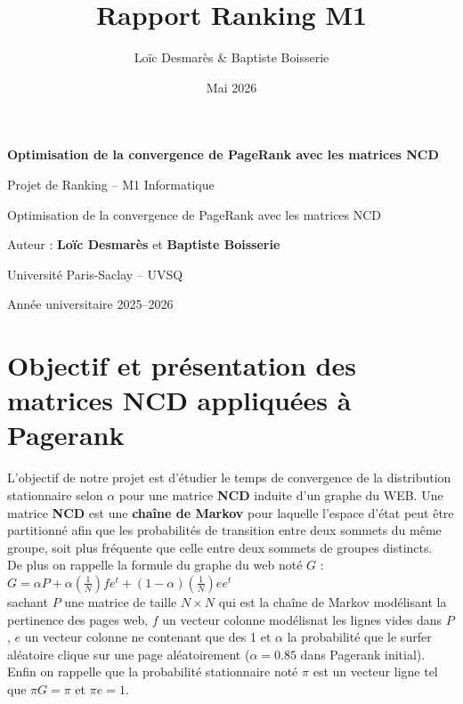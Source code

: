 \documentclass[11pt,oneside,a4paper,french]{article}
\title{Rapport Ranking M1}
\author{Loïc Desmarès & Baptiste Boisserie}
\date{Mai 2026}
\begin{document}
\begin{titlepage}
    \begin{center}

        \vspace*{4cm}
        {\Huge \textbf{Optimisation de la convergence de PageRank avec les matrices NCD} \par}

        \vspace{3cm}
        {\Large Projet de Ranking -- M1 Informatique \par}

        \vspace{0.3cm}
        {\large Optimisation de la convergence de PageRank avec les matrices NCD \par}

        \vspace{8cm}
        {\Large Auteur : \textbf{Loïc Desmarès} et \textbf{Baptiste Boisserie} \par}

        \vspace{1cm}
        {\large Université Paris-Saclay -- UVSQ \par}

        \vspace{0.3cm}
        {\large Année universitaire 2025--2026 \par}
    \end{center}
\end{titlepage}

\newpage
\tableofcontents

\newpage
\section{Objectif et présentation des matrices NCD appliquées à Pagerank}

L'objectif de notre projet est d'étudier le temps de convergence de la distribution stationnaire selon $\alpha$ pour une matrice \textbf{NCD} induite d'un graphe du WEB. Une matrice \textbf{NCD} est une \textbf{chaîne de Markov} pour laquelle l'espace d'état peut être partitionné afin que les probabilités de transition entre deux sommets du même groupe, soit plus fréquente que celle entre deux sommets de groupes distincts.\\
De plus on rappelle la formule du graphe du web noté $G$ : $G = \alpha P + \alpha (\frac{1}{N}) f e^t + (1-\alpha)(\frac{1}{N})e e^t$\\
sachant $P$ une matrice de taille $N \times N$ qui est la chaîne de Markov modélisant la pertinence des pages web, $f$ un vecteur colonne modélisnat les lignes vides dans $P$, $e$ un vecteur colonne ne contenant que des 1 et $\alpha$ la probabilité que le surfer aléatoire clique sur une page aléatoirement ($\alpha = 0.85$ dans Pagerank initial). Enfin on rappelle que la probabilité stationnaire noté $\pi$ est un vecteur ligne tel que $\pi G = \pi$ et $\pi e = 1$.
\end{document}
